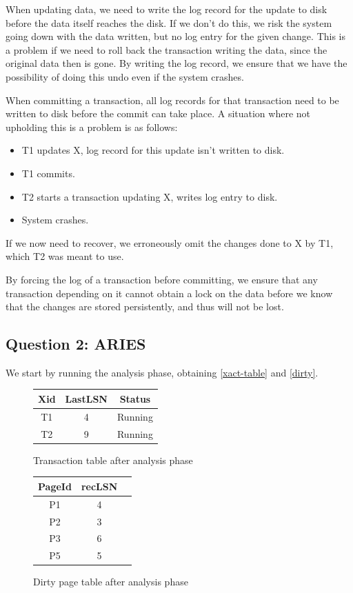 \documentclass[11pt,a4paper]{article}
\begin{document}
When updating data, we need to write the log record for the update to disk
before the data itself reaches the disk. If we don't do this, we risk the
system going down with the data written, but no log entry for the given
change. This is a problem if we need to roll back the transaction writing
the data, since the original data then is gone. By writing the log record,
we ensure that we have the possibility of doing this undo even if the system
crashes.

When committing a transaction, all log records for that transaction need to be
written to disk before the commit can take place. A situation where not upholding
this is a problem is as follows:

\begin{itemize}
    \item T1 updates X, log record for this update isn't written to disk.
    \item T1 commits.
    \item T2 starts a transaction updating X, writes log entry to disk.
    \item System crashes.
\end{itemize}

If we now need to recover, we erroneously omit the changes done to X by T1,
which T2 was meant to use.

By forcing the log of a transaction before committing, we ensure that any
transaction depending on it cannot obtain a lock on the data before we know
that the changes are stored persistently, and thus will not be lost.

\subsection{Question 2: ARIES}
We start by running the analysis phase, obtaining \autoref{xact-table} and \autoref{dirty}.

\begin{figure}[h!]
    \centering
\begin{tabular}{|c|c|c|}
    \hline
    Xid & LastLSN & Status \\
    \hline
    T1  & 4       & Running \\
    T2  & 9       & Running \\
    \hline
\end{tabular}
\caption{Transaction table after analysis phase}
\label{xact-table}
\end{figure}

\begin{figure}[h!]
    \centering
\begin{tabular}{|c|c|c|}
    \hline
    PageId & recLSN \\
    \hline
    P1     & 4 \\
    P2     & 3 \\
    P3     & 6 \\
    P5     & 5 \\
    \hline
\end{tabular}
\caption{Dirty page table after analysis phase}
\label{dirty}
\end{figure}
\end{document}
